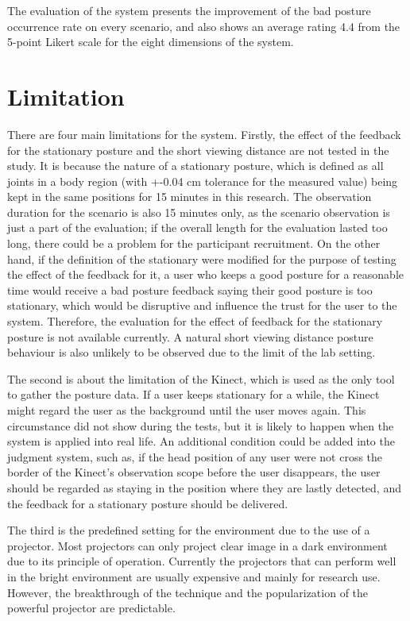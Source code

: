 The evaluation of the system presents the improvement of the bad posture occurrence rate on every scenario, and also shows an average rating 4.4 from the 5-point Likert scale for the eight dimensions of the system.

\section{Limitation}
There are four main limitations for the system. Firstly, the effect of the feedback for the stationary posture and the short viewing distance are not tested in the study. It is because the nature of a stationary posture, which is defined as all joints in a body region (with +-0.04 cm tolerance for the measured value) being kept in the same positions for 15 minutes in this research. The observation duration for the scenario is also 15 minutes only, as the scenario observation is just a part of the evaluation; if the overall length for the evaluation lasted too long, there could be a problem for the participant recruitment. On the other hand, if the definition of the stationary were modified for the purpose of testing the effect of the feedback for it, a user who keeps a good posture for a reasonable time would receive a bad posture feedback saying their good posture is too stationary, which would be disruptive and influence the trust for the user to the system. Therefore, the evaluation for the effect of feedback for the stationary posture is not available currently. A natural short viewing distance posture behaviour is also unlikely to be observed due to the limit of the lab setting.

The second is about the limitation of the Kinect, which is used as the only tool to gather the posture data. If a user keeps stationary for a while, the Kinect might regard the user as the background until the user moves again. This circumstance did not show during the tests, but it is likely to happen when the system is applied into real life. An additional condition could be added into the judgment system, such as, if the head position of any user were not cross the border of the Kinect’s observation scope before the user disappears, the user should be regarded as staying in the position where they are lastly detected, and the feedback for a stationary posture should be delivered.

The third is the predefined setting for the environment due to the use of a projector. Most projectors can only project clear image in a dark environment due to its principle of operation. Currently the projectors that can perform well in the bright environment are usually expensive and mainly for research use. However, the breakthrough of the technique and the popularization of the powerful projector are predictable.


